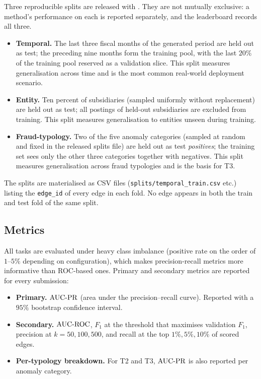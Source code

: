 Three reproducible splits are released with \bench{}.  They are not
mutually exclusive: a method's performance on each is reported
separately, and the leaderboard records all three.

\begin{itemize}
  \item \textbf{Temporal.}  The last three fiscal months of the
    generated period are held out as test; the preceding nine
    months form the training pool, with the last $20\%$ of the
    training pool reserved as a validation slice.  This split
    measures generalisation across time and is the most common
    real-world deployment scenario.
  \item \textbf{Entity.}  Ten percent of subsidiaries
    (sampled uniformly without replacement) are held out as test;
    all postings of held-out subsidiaries are excluded from
    training.  This split measures generalisation to entities
    unseen during training.
  \item \textbf{Fraud-typology.}  Two of the five anomaly
    categories (sampled at random and fixed in the released
    splits file) are held out as test \emph{positives}; the
    training set sees only the other three categories together
    with negatives.  This split measures generalisation across
    fraud typologies and is the basis for T3.
\end{itemize}

The splits are materialised as CSV files
(\texttt{splits/temporal\_train.csv} etc.\@) listing the
\texttt{edge\_id} of every edge in each fold.  No edge appears in
both the train and test fold of the same split.

\subsection{Metrics}
\label{sec:benchmark:metrics}

All tasks are evaluated under heavy class imbalance (positive rate
on the order of $1$--$5\%$ depending on configuration), which
makes precision-recall metrics more informative than ROC-based ones.
Primary and secondary metrics are reported for every submission:

\begin{itemize}
  \item \textbf{Primary.}  $\operatorname{AUC\text{-}PR}$ (area under the
    precision--recall curve).  Reported with a $95\%$ bootstrap
    confidence interval.
  \item \textbf{Secondary.}  $\operatorname{AUC\text{-}ROC}$, $F_1$ at the
    threshold that maximises validation $F_1$, precision at
    $k = 50, 100, 500$, and recall at the top $1\%, 5\%, 10\%$ of
    scored edges.
  \item \textbf{Per-typology breakdown.}  For T2 and T3, $\operatorname{AUC\text{-}PR}$
    is also reported per anomaly category.
\end{itemize}

